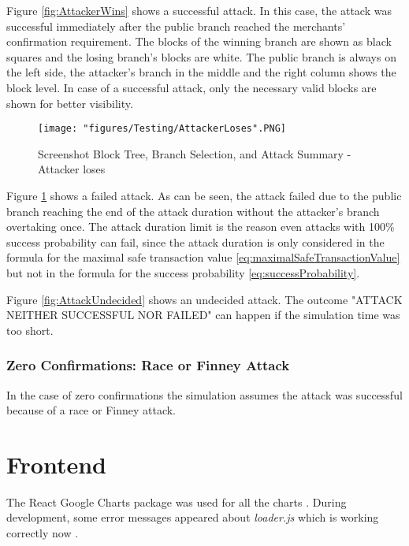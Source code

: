 Figure \ref{fig:AttackerWins} shows a successful attack. In this case, the attack was successful immediately after the public branch reached the merchants' confirmation requirement. The blocks of the winning branch are shown as black squares and the losing branch's blocks are white. The public branch is always on the left side, the attacker's branch in the middle and the right column shows the block level. In case of a successful attack, only the necessary valid blocks are shown for better visibility.

\begin{figure}[!htb]
\centering
\texttt{[image: "figures/Testing/AttackerLoses".PNG]}
\caption{Screenshot Block Tree, Branch Selection, and Attack Summary - Attacker loses
\label{fig:AttackerLoses}}
\end{figure}

Figure \ref{fig:AttackerLoses} shows a failed attack. As can be seen, the attack failed due to the public branch reaching the end of the attack duration without the attacker's branch overtaking once. The attack duration limit is the reason even attacks with 100\% success probability can fail, since the attack duration is only considered in the formula for the maximal safe transaction value \eqref{eq:maximalSafeTransactionValue} but not in the formula for the success probability \eqref{eq:successProbability}.

Figure \ref{fig:AttackUndecided} shows an undecided attack. The outcome "ATTACK NEITHER SUCCESSFUL NOR FAILED" can happen if the simulation time was too short.

\subsubsection{Zero Confirmations: Race or Finney Attack}
In the case of zero confirmations the simulation assumes the attack was successful because of a race or Finney attack.

\section{Frontend}
The React Google Charts package was used for all the charts \cite{reactgooglecharts}. During development, some error messages appeared about \textit{loader.js} which is working correctly now \cite{reactgooglechartsissue1} \cite{reactgooglechartsissue2}.

